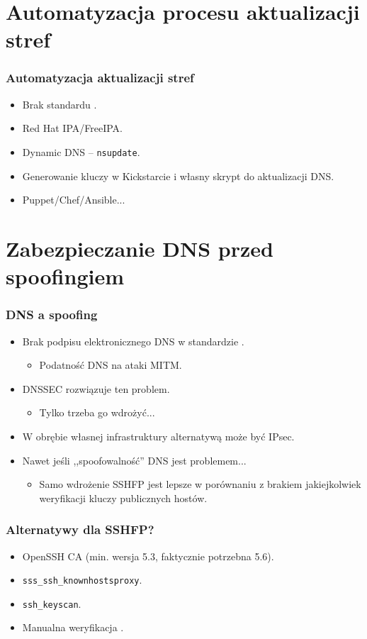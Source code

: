 \documentclass[dvipsnames,table]{beamer}
\begin{document}
\section{Automatyzacja procesu aktualizacji stref}

\begin{frame}
\frametitle{Automatyzacja aktualizacji stref}
\begin{itemize}
	\item Brak standardu \Sadey.
	\item Red Hat IPA/FreeIPA.
	\item Dynamic DNS -- {\tt nsupdate}.
	\item Generowanie kluczy w Kickstarcie i własny skrypt do aktualizacji DNS.
	\item Puppet/Chef/Ansible...
\end{itemize}
\end{frame}

\section{Zabezpieczanie DNS przed spoofingiem}

\begin{frame}
\frametitle{DNS a spoofing}
\begin{itemize}
	\item Brak podpisu elektronicznego DNS w standardzie \Sadey.
	\begin{itemize}
		\item Podatność DNS na ataki MITM.
	\end{itemize}
	\item DNSSEC rozwiązuje ten problem.
	\begin{itemize}
		\item Tylko trzeba go wdrożyć...
	\end{itemize}
	\item W obrębie własnej infrastruktury alternatywą może być IPsec.
	
	\item Nawet jeśli ,,spoofowalność'' DNS jest problemem...
	\begin{itemize}
		\item Samo wdrożenie SSHFP jest lepsze w porównaniu z brakiem jakiejkolwiek weryfikacji kluczy publicznych hostów.
	\end{itemize}
\end{itemize}
\end{frame}

\begin{frame}
\frametitle{Alternatywy dla SSHFP?}
\begin{itemize}
	\item OpenSSH CA (min. wersja 5.3, faktycznie potrzebna 5.6).
	\item {\tt sss\_ssh\_knownhostsproxy}.
	\item {\tt ssh\_keyscan}.
	\item Manualna weryfikacja \Sadey.
\end{itemize}
\end{frame}
\end{document}
